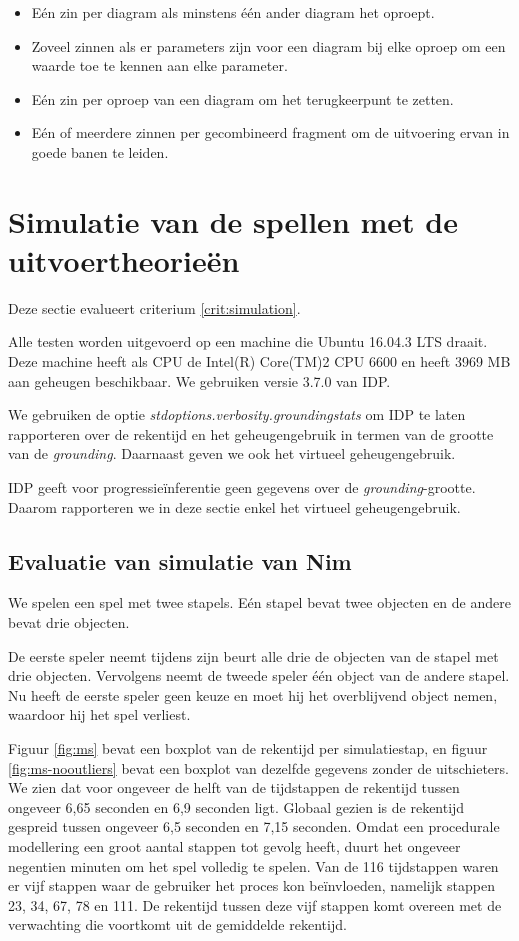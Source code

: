 \begin{itemize}
	\item E\'en zin per diagram als minstens \'e\'en ander diagram het oproept.
	\item Zoveel zinnen als er parameters zijn voor een diagram bij elke oproep om een waarde toe te kennen aan elke parameter.
	\item E\'en zin per oproep van een diagram om het terugkeerpunt te zetten.
	\item E\'en of meerdere zinnen per gecombineerd fragment om de uitvoering ervan in goede banen te leiden.
\end{itemize}

\section{Simulatie van de spellen met de uitvoertheorie\"en}

Deze sectie evalueert criterium \ref{crit:simulation}.

Alle testen worden uitgevoerd op een machine die Ubuntu 16.04.3 LTS draait. Deze machine heeft als CPU de Intel(R) Core(TM)2 CPU 6600 en heeft 3969 MB aan geheugen beschikbaar. We gebruiken versie 3.7.0 van IDP.

We gebruiken de optie \textit{stdoptions.verbosity.groundingstats} om IDP te laten rapporteren over de rekentijd en het geheugengebruik in termen van de grootte van de \textit{grounding}\cite{DeCatBroes2014PLaa}. Daarnaast geven we ook het virtueel geheugengebruik.

IDP geeft voor progressie\"inferentie geen gegevens over de \textit{grounding}-grootte. Daarom rapporteren we in deze sectie enkel het virtueel geheugengebruik.

\subsection{Evaluatie van simulatie van Nim}

We spelen een spel met twee stapels. E\'en stapel bevat twee objecten en de andere bevat drie objecten.

De eerste speler neemt tijdens zijn beurt alle drie de objecten van de stapel met drie objecten. Vervolgens neemt de tweede speler \'e\'en object van de andere stapel. Nu heeft de eerste speler geen keuze en moet hij het overblijvend object nemen, waardoor hij het spel verliest.

Figuur \ref{fig:ms} bevat een boxplot van de rekentijd per simulatiestap, en figuur \ref{fig:ms-nooutliers} bevat een boxplot van dezelfde gegevens zonder de uitschieters. We zien dat voor ongeveer de helft van de tijdstappen de rekentijd tussen ongeveer 6,65 seconden en 6,9 seconden ligt. Globaal gezien is de rekentijd gespreid tussen ongeveer 6,5 seconden en 7,15 seconden. Omdat een procedurale modellering een groot aantal stappen tot gevolg heeft, duurt het ongeveer negentien minuten om het spel volledig te spelen. Van de 116 tijdstappen waren er vijf stappen waar de gebruiker het proces kon be\"invloeden, namelijk stappen 23, 34, 67, 78 en 111. De rekentijd tussen deze vijf stappen komt overeen met de verwachting die voortkomt uit de gemiddelde rekentijd.

